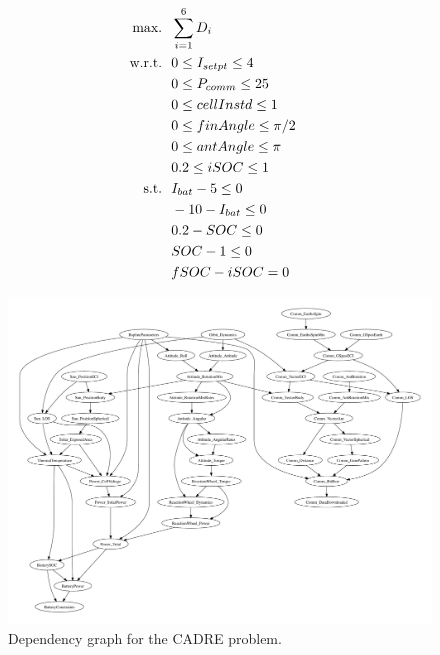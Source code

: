 \documentclass[]{aiaa-tc} %
\newcommand{\txt}{\textrm}
\begin{document}
    \begin{align}
        \\\txt{max.} &\ \ \sum_{i=1}^6 D_i \notag
        \\\txt{w.r.t.} & \ \ 0 \le I_{setpt} \le 4 \notag
        \\     & \ \ 0 \le P_{comm} \le 25 \notag
        \\     & \ \ 0 \le cellInstd \le 1 \notag
        \\     & \ \ 0 \le finAngle \le \pi/2 \notag
        \\     & \ \ 0 \le antAngle \le \pi \notag
        \\     & \ \ 0.2 \le iSOC \le 1 \notag
        \\\txt{s.t.} & \ \ I_{bat} - 5 \le 0 \notag
        \\     & \ \ -10 - I_{bat} \le 0 \notag
        \\     & \ \ 0.2 - SOC \le 0 \notag
        \\     & \ \ SOC - 1 \le 0 \notag
        \\     & \ \ fSOC - iSOC = 0 \notag
        \label{eqn:sellar_formulation}
    \end{align}


    \begin{figure}[!htb]\begin{center}
      \includegraphics[width=1.1\textwidth]{images/CADRE.pdf}
      \caption{ Dependency graph for the CADRE problem. \label{fig:cadre_graph}}
    \end{center}\end{figure}
\end{document}
